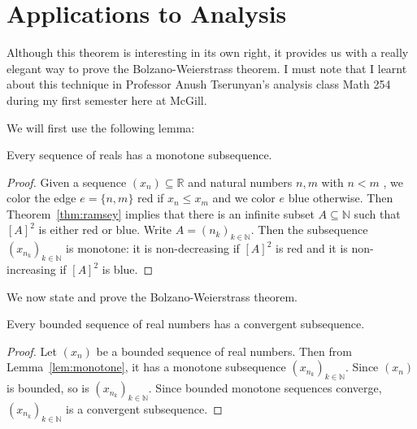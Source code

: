 \section{Applications to Analysis}
Although this theorem is interesting in its own right, it provides us with a really elegant way to prove the Bolzano-Weierstrass theorem. I must note that I learnt about this technique in Professor Anush Tserunyan's analysis class Math 254 during my first semester here at McGill.

We will first use the following lemma:
\begin{lemma}
\label{lem:monotone}
Every sequence of reals has a monotone subsequence.
\end{lemma}
\begin{proof}
	Given a sequence \( (x_{n}) \subseteq \mathbb{R} \) and natural numbers \( n , m  \) with \( n < m \) , we color the edge \( e = \{n , m \}  \) red if \( x_{n} \leq x_{m}  \) and we color \( e \) blue otherwise. Then Theorem~\ref{thm:ramsey} implies that there is an infinite subset \( A \subseteq \mathbb{N}  \) such that \( [A]^{2}  \) is either red or blue. Write \( A = (n_{k} )_{k \in \mathbb{N} }  \). Then the subsequence \( (x_{n_{k} })_{k \in \mathbb{N}}  \) is monotone: it is non-decreasing if \( [A]^{2}  \) is red and it is non-increasing if \( [A]^{2}  \) is blue.
\end{proof}
We now state and prove the Bolzano-Weierstrass theorem.
\begin{theorem}
Every bounded sequence of real numbers has a convergent subsequence.
\end{theorem}
\begin{proof}
Let \( (x_{n}) \) be a bounded sequence of real numbers. Then from Lemma~\ref{lem:monotone}, it has a monotone subsequence \( (x_{n_{k} })_{k \in \mathbb{N} } \). Since \( (x_{n}) \) is bounded, so is \( (x_{n_{k} })_{k \in \mathbb{N}}  \). Since bounded monotone sequences converge, \( (x_{n_{k} })_{k \in \mathbb{N} }   \) is a convergent subsequence.
\end{proof}
